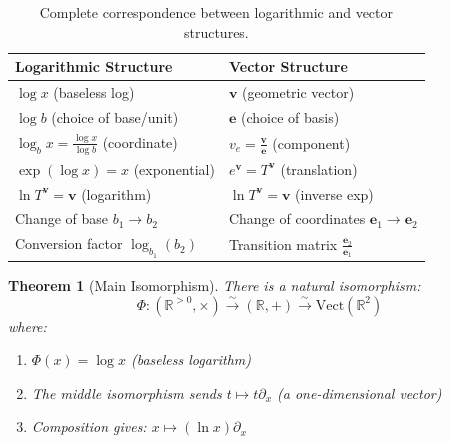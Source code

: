 \documentclass[11pt]{article}
\newtheorem{theorem}[definition]{Theorem}
\begin{document}
\begin{table}[h]
\centering
\begin{tabular}{|l|l|}
\hline
\textbf{Logarithmic Structure} & \textbf{Vector Structure} \\
\hline
$\log x$ (baseless log) & $\mathbf{v}$ (geometric vector) \\
$\log b$ (choice of base/unit) & $\mathbf{e}$ (choice of basis) \\
$\log_b x = \frac{\log x}{\log b}$ (coordinate) & $v_e = \frac{\mathbf{v}}{\mathbf{e}}$ (component) \\
$\exp(\log x) = x$ (exponential) & $e^{\mathbf{v}} = T^{\mathbf{v}}$ (translation) \\
$\ln T^{\mathbf{v}} = \mathbf{v}$ (logarithm) & $\ln T^{\mathbf{v}} = \mathbf{v}$ (inverse exp) \\
Change of base $b_1 \to b_2$ & Change of coordinates $\mathbf{e}_1 \to \mathbf{e}_2$ \\
Conversion factor $\log_{b_1}(b_2)$ & Transition matrix $\frac{\mathbf{e}_2}{\mathbf{e}_1}$ \\
\hline
\end{tabular}
\caption{Complete correspondence between logarithmic and vector structures.}
\end{table}

\begin{theorem}[Main Isomorphism]
There is a natural isomorphism:
\[
\Phi: (\mathbb{R}^{>0}, \times) \xrightarrow{\sim} (\mathbb{R}, +) \xrightarrow{\sim} \text{Vect}(\mathbb{R}^2)
\]
where:
\begin{enumerate}
\item $\Phi(x) = \log x$ (baseless logarithm)
\item The middle isomorphism sends $t \mapsto t \partial_x$ (a one-dimensional vector)
\item Composition gives: $x \mapsto (\ln x) \partial_x$
\end{enumerate}
\end{theorem}
\end{document}
